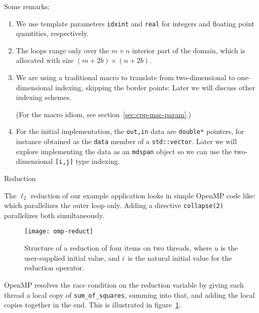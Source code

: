 Some remarks:
\begin{enumerate}
\item We use template parameters \lstinline{idxint} and \lstinline{real}
  for integers and floating point quantities, respectively.
\item
  The loops range only over the $m\times n$ interior part of the domain,
  which is allocated with size $(m+2b)\times(n+2b)$.
\item We are using a traditional macro to translate from two-dimensional
  to one-dimensional indexing, skipping the border points:
  Later we will discuss other indexing schemes.
\begin{packt}
    (For the macro idiom, see section~\ref{sec:cpp-mac-param}.)
\end{packt}
\item
  For the initial implementation, the \lstinline{out,in} data
  are \lstinline{double*} pointers, for instance obtained
  as the \lstinline{data} member of a \lstinline{std::vector}.
  Later we will explore implementing the data as an \lstinline{mdspan} object
  so we can use the two-dimensional \lstinline{[i,j]} type indexing.
\end{enumerate}

 {Reduction}

The $\ell_2$ reduction of our example application
looks in simple OpenMP code like:
%
%
which parallelizes the outer loop only.
Adding a directive \lstinline[language=omp]{collapse(2)}
parallelizes both simultaneously.



\begin{figure}[t]
  \texttt{[image: omp-reduct]}
  \caption{Structure of a reduction of four items on two threads,
    where $u$ is the user-supplied initial value,
    and $i$~is the natural initial value for the reduction operator.}
  \label{fig:omp-reduct}
\end{figure}


OpenMP resolves the race condition on the reduction variable
by giving each thread a local copy of \lstinline{sum_of_squares},
summing into that, and adding the local copies together in the end.
This is illustrated in figure~\ref{fig:omp-reduct}.

